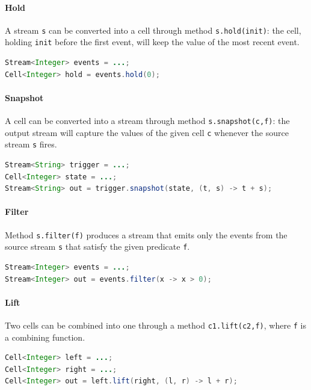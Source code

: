 \paragraph{Hold}
A stream \texttt{s} can be converted into a cell through method \texttt{s.hold(init)}: the cell, holding \texttt{init} before the first event, will keep the value of the most recent event.
%
\begin{lstlisting}[frame=single, language=java]
Stream<Integer> events = ...;
Cell<Integer> hold = events.hold(0);
\end{lstlisting}

\paragraph{Snapshot}
A cell can be converted into a stream
 through method \texttt{s.snapshot(c,f)}:
 the output stream will capture the values of the given cell \texttt{c} whenever the source stream \texttt{s} fires.
%
%
\begin{lstlisting}[frame=single, language=java]
Stream<String> trigger = ...;
Cell<Integer> state = ...;
Stream<String> out = trigger.snapshot(state, (t, s) -> t + s);
\end{lstlisting}

\paragraph{Filter}
Method \texttt{s.filter(f)} produces a stream that emits only the events from the source stream \texttt{s} that satisfy the given predicate \texttt{f}.
%
\begin{lstlisting}[frame=single, language=java]
Stream<Integer> events = ...;
Stream<Integer> out = events.filter(x -> x > 0);
\end{lstlisting}

\paragraph{Lift}
Two cells can be combined into one through a method \texttt{c1.lift(c2,f)}, where \texttt{f} is a combining function.
%
\begin{lstlisting}[frame=single, language=java]
Cell<Integer> left = ...;
Cell<Integer> right = ...;
Cell<Integer> out = left.lift(right, (l, r) -> l + r);
\end{lstlisting}

